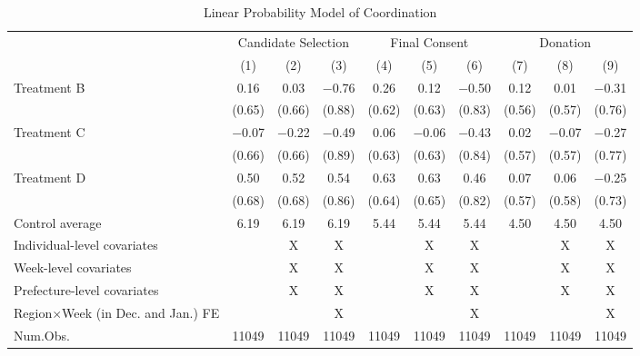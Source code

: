 \documentclass[12pt, a4paper]{article}
\begin{document}
\begin{table}[H]

\caption{\label{tab:coordinate-reg}Linear Probability Model of Coordination}
\centering
\fontsize{8}{10}\selectfont
\begin{threeparttable}
\begin{tabular}[t]{lccccccccc}
\toprule
\multicolumn{1}{c}{ } & \multicolumn{3}{c}{Candidate Selection} & \multicolumn{3}{c}{Final Consent} & \multicolumn{3}{c}{Donation} \\
\cmidrule(l{3pt}r{3pt}){2-4} \cmidrule(l{3pt}r{3pt}){5-7} \cmidrule(l{3pt}r{3pt}){8-10}
  & (1) & (2) & (3) & (4) & (5) & (6) & (7) & (8) & (9)\\
\midrule
Treatment B & \num{0.16} & \num{0.03} & \num{-0.76} & \num{0.26} & \num{0.12} & \num{-0.50} & \num{0.12} & \num{0.01} & \num{-0.31}\\
 & (\num{0.65}) & (\num{0.66}) & (\num{0.88}) & (\num{0.62}) & (\num{0.63}) & (\num{0.83}) & (\num{0.56}) & (\num{0.57}) & (\num{0.76})\\
Treatment C & \num{-0.07} & \num{-0.22} & \num{-0.49} & \num{0.06} & \num{-0.06} & \num{-0.43} & \num{0.02} & \num{-0.07} & \num{-0.27}\\
 & (\num{0.66}) & (\num{0.66}) & (\num{0.89}) & (\num{0.63}) & (\num{0.63}) & (\num{0.84}) & (\num{0.57}) & (\num{0.57}) & (\num{0.77})\\
Treatment D & \num{0.50} & \num{0.52} & \num{0.54} & \num{0.63} & \num{0.63} & \num{0.46} & \num{0.07} & \num{0.06} & \num{-0.25}\\
 & (\num{0.68}) & (\num{0.68}) & (\num{0.86}) & (\num{0.64}) & (\num{0.65}) & (\num{0.82}) & (\num{0.57}) & (\num{0.58}) & (\num{0.73})\\
\midrule
Control average & 6.19 & 6.19 & 6.19 & 5.44 & 5.44 & 5.44 & 4.50 & 4.50 & 4.50\\
Individual-level covariates &  & X & X &  & X & X &  & X & X\\
Week-level covariates &  & X & X &  & X & X &  & X & X\\
Prefecture-level covariates &  & X & X &  & X & X &  & X & X\\
Region$\times$Week (in Dec. and Jan.) FE &  &  & X &  &  & X &  &  & X\\
Num.Obs. & \num{11049} & \num{11049} & \num{11049} & \num{11049} & \num{11049} & \num{11049} & \num{11049} & \num{11049} & \num{11049}\\
\bottomrule
\end{tabular}
\begin{tablenotes}

\end{tablenotes}
\end{threeparttable}
\end{table}
\end{document}
